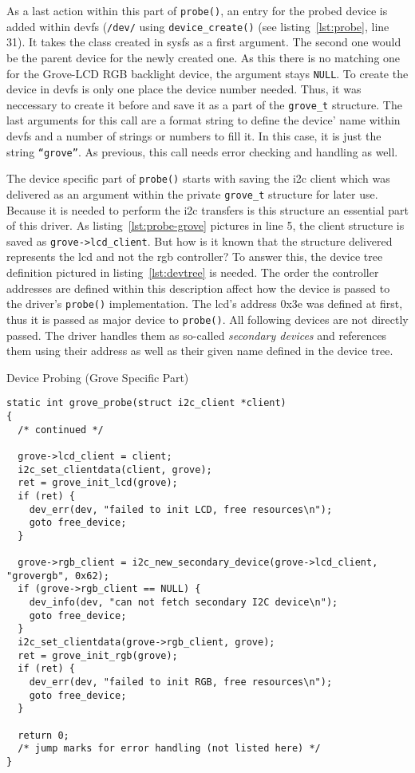 As a last action within this part of \texttt{probe()}, an entry for the probed device is added within devfs (\texttt{/dev/} using \texttt{device_create()} (see listing~\ref{lst:probe}, line 31).
It takes the class created in sysfs as a first argument.
The second one would be the parent device for the newly created one. 
As this there is no matching one for the Grove-LCD RGB backlight device, the argument stays \texttt{NULL}.
To create the device in devfs is only one place the device number needed.
Thus, it was neccessary to create it before and save it as a part of the \texttt{grove\_t} structure.
The last arguments for this call are a format string to define the device' name within devfs and a number of strings or numbers to fill it.
In this case, it is just the string \texttt{``grove''}.
As previous, this call needs error checking and handling as well.


The device specific part of \texttt{probe()} starts with saving the \ac{i2c} client which was delivered as an argument within the private \texttt{grove\_t} structure for later use.
Because it is needed to perform the \ac{i2c} transfers is this structure an essential part of this driver.
As listing~\ref{lst:probe-grove} pictures in line 5, the client structure is saved as \texttt{grove->lcd_client}.
But how is it known that the structure delivered represents the \ac{lcd} and not the \ac{rgb} controller?
To answer this, the device tree definition pictured in listing~\ref{lst:devtree} is needed.
The order the controller addresses are defined within this description affect how the device is passed to the driver's \texttt{probe()} implementation.
The \ac{lcd}'s address 0x3e was defined at first, thus it is passed as major device to \texttt{probe()}.
All following devices are not directly passed.
The driver handles them as so-called \textit{secondary devices} and references them using their address as well as their given name defined in the device tree.

\begin{listing} [h]
    \caption{Device Probing (Grove Specific Part)}
    \label{lst:probe-grove}
    \begin{verbatim}
static int grove_probe(struct i2c_client *client)
{
  /* continued */  
  
  grove->lcd_client = client;
  i2c_set_clientdata(client, grove);
  ret = grove_init_lcd(grove);
  if (ret) {
	dev_err(dev, "failed to init LCD, free resources\n");
	goto free_device;
  }

  grove->rgb_client = i2c_new_secondary_device(grove->lcd_client, "grovergb", 0x62);
  if (grove->rgb_client == NULL) {
	dev_info(dev, "can not fetch secondary I2C device\n");
	goto free_device;
  }
  i2c_set_clientdata(grove->rgb_client, grove);
  ret = grove_init_rgb(grove);
  if (ret) {
    dev_err(dev, "failed to init RGB, free resources\n");
    goto free_device;
  }

  return 0;
  /* jump marks for error handling (not listed here) */
}
    \end{verbatim}
\end{listing}

